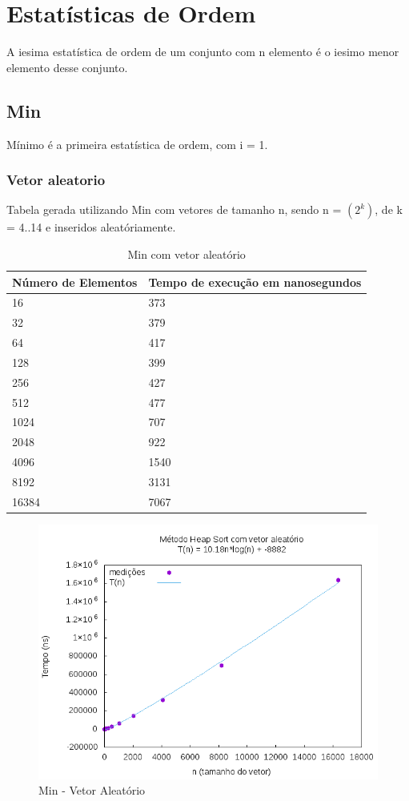 \documentclass[12pt,a4paper,twoside]{report}
\begin{document}
\chapter{Estatísticas de Ordem}
A iesima estatística de ordem de um conjunto com n elemento é o iesimo menor elemento desse conjunto.
\section{Min}

Mínimo é a primeira estatística de ordem, com i = 1.

\subsection{Vetor aleatorio}
Tabela gerada utilizando Min com vetores de tamanho n, sendo n = $(2^k)$, de k = 4..14 e inseridos aleatóriamente.
\begin{table}[H]
\centering
\caption{Min com vetor aleatório}
\label{my-label}
\begin{tabular}{|l|l|}
\hline
\multicolumn{1}{|c|}{\textbf{Número de Elementos}} & \multicolumn{1}{c|}{\textbf{Tempo de execução em nanosegundos}} \\ \hline
16 & 373 \\ \hline
32 & 379 \\ \hline
64 & 417 \\ \hline
128 & 399 \\ \hline
256 & 427 \\ \hline
512 & 477 \\ \hline
1024 & 707 \\ \hline
2048 & 922 \\ \hline
4096 & 1540 \\ \hline
8192 & 3131 \\ \hline
16384 & 7067 \\ \hline
\end{tabular}
\end{table}

\begin{figure}[H]
    \centering
    \includegraphics[width=0.7\linewidth]{graficos/HeapSort/vIntAleatorio/vIntAleatorio.png}
  \caption{Min - Vetor Aleatório}
\end{figure}
\end{document}
